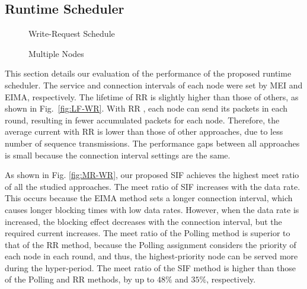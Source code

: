 \documentclass[10pt,journal,compsoc]{IEEEtran}
\begin{document}
\subsection{Runtime Scheduler}\label{sec:exp-wqsche}
\begin{figure*}[!tbhp]
\begin{minipage}[b]{\linewidth}
\vspace{-0.5em}
\centering
{}\vspace{-0.5em}
\caption{Write-Request Schedule} \label{fig:figWR} %
\end{minipage}
\end{figure*}

\begin{figure*}[t]
\begin{minipage}[b]{\linewidth}
\vspace{-0.5em}
\centering
{}\vspace{-0.5em}
\caption{Multiple Nodes} \label{fig:Exper_Sche} %
\end{minipage}
\end{figure*}

This section details our evaluation of the performance of the proposed runtime scheduler. The service and connection intervals of each node were set by MEI and EIMA, respectively.
The lifetime of RR is slightly higher than those of others, as shown in Fig.~\ref{fig:LF-WR}. With RR , each node can send its packets in each round, resulting in fewer accumulated packets for each node. Therefore, the average current with RR is lower than those of other approaches, due to less number of sequence transmissions. The performance gaps between all approaches is small because the connection interval settings are the same.

As shown in Fig. \ref{fig:MR-WR}, our proposed SIF achieves the highest meet ratio of all the studied approaches. The meet ratio of SIF increases with the data rate. This occurs because the EIMA method sets a longer connection interval, which causes longer blocking times with low data rates. However, when the data rate is increased, the blocking effect decreases with the connection interval, but the required current increases. The meet ratio of the Polling method is superior to that of the RR method, because the Polling assignment considers the priority of each node in each round, and thus, the highest-priority node can be served more during the hyper-period. The meet ratio of the SIF method is higher than those of the Polling and RR methods, by up to $48\%$ and $35\%$, respectively.
\end{document}
